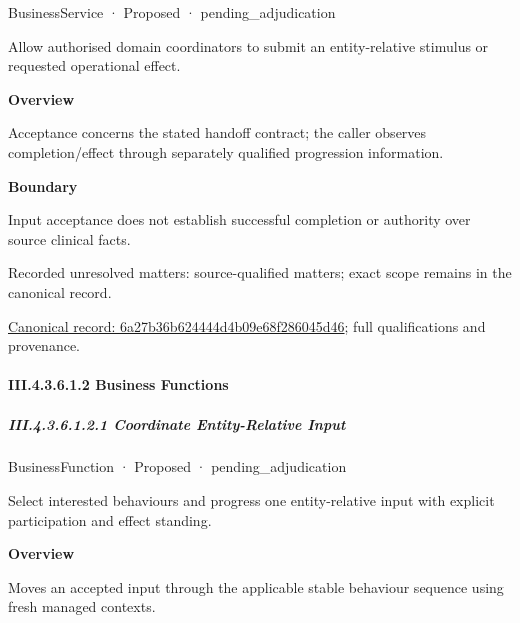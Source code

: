 \label{element:6a27b36b624444d4b09e68f286045d46}
{\small BusinessService · Proposed · pending\_adjudication}\par

Allow authorised domain coordinators to submit an entity-relative stimulus or requested operational effect.



\textbf{Overview}



Acceptance concerns the stated handoff contract; the caller observes completion/effect through separately qualified progression information.



\textbf{Boundary}



Input acceptance does not establish successful completion or authority over source clinical facts.


{\small Recorded unresolved matters: source-qualified matters; exact scope remains in the canonical record.}\par
{\footnotesize \href{../../../../../../../../continuum/business/business-service/6a27b36b624444d4b09e68f286045d46.md}{Canonical record: 6a27b36b624444d4b09e68f286045d46}; full qualifications and provenance.}\par
\paragraph*{III.4.3.6.1.2 Business Functions}
\label{navigation:III.4.3.6.1.2}

\subparagraph*{III.4.3.6.1.2.1 Coordinate Entity-Relative Input}
\label{navigation:III.4.3.6.1.2.1}

\label{element:78417d5c46cc406f95e6a41d22e3f143}
{\small BusinessFunction · Proposed · pending\_adjudication}\par

Select interested behaviours and progress one entity-relative input with explicit participation and effect standing.



\textbf{Overview}



Moves an accepted input through the applicable stable behaviour sequence using fresh managed contexts.



